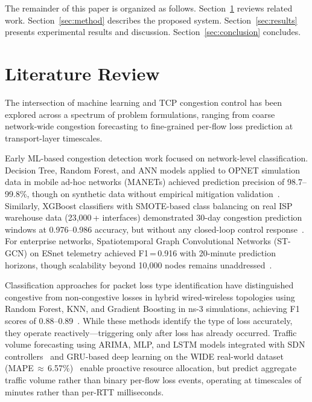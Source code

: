 \documentclass[journal]{IEEEtran}
\begin{document}
The remainder of this paper is organized as follows. Section~\ref{sec:related} reviews related work. Section~\ref{sec:method} describes the proposed system. Section~\ref{sec:results} presents experimental results and discussion. Section~\ref{sec:conclusion} concludes.

\section{Literature Review}
\label{sec:related}

The intersection of machine learning and TCP congestion control has been explored across a spectrum of problem formulations, ranging from coarse network-wide congestion forecasting to fine-grained per-flow loss prediction at transport-layer timescales.

Early ML-based congestion detection work focused on network-level classification. Decision Tree, Random Forest, and ANN models applied to OPNET simulation data in mobile ad-hoc networks (MANETs) achieved prediction precision of 98.7--99.8\%, though on synthetic data without empirical mitigation validation~\cite{manet}. Similarly, XGBoost classifiers with SMOTE-based class balancing on real ISP warehouse data (23,000\,+ interfaces) demonstrated 30-day congestion prediction windows at 0.976--0.986 accuracy, but without any closed-loop control response~\cite{ptcl}. For enterprise networks, Spatiotemporal Graph Convolutional Networks (ST-GCN) on ESnet telemetry achieved F1\,=\,0.916 with 20-minute prediction horizons, though scalability beyond 10,000 nodes remains unaddressed~\cite{stgcn}.

Classification approaches for packet loss type identification have distinguished congestive from non-congestive losses in hybrid wired-wireless topologies using Random Forest, KNN, and Gradient Boosting in ns-3 simulations, achieving F1 scores of 0.88--0.89~\cite{ali2024}. While these methods identify the type of loss accurately, they operate reactively---triggering only after loss has already occurred. Traffic volume forecasting using ARIMA, MLP, and LSTM models integrated with SDN controllers~\cite{labonne} and GRU-based deep learning on the WIDE real-world dataset (MAPE\,$\approx$\,6.57\%)~\cite{wide2025} enable proactive resource allocation, but predict aggregate traffic volume rather than binary per-flow loss events, operating at timescales of minutes rather than per-RTT milliseconds.
\end{document}
